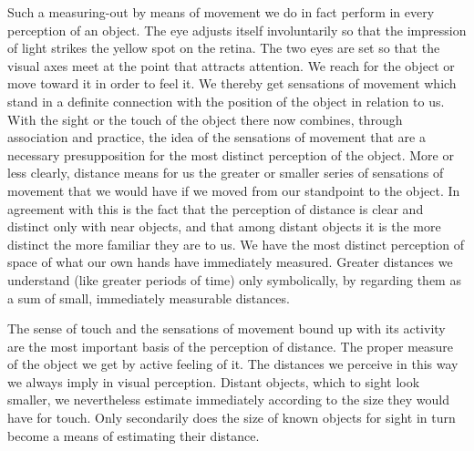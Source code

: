 \documentclass[12pt,a4paper]{book}
\newcommand{\opage}[1]{\marginnote{\footnotesize\textit{[#1]}}}
\begin{document}
Such a measuring-out by means of movement we do in fact perform in every
perception of an object. The eye adjusts itself involuntarily so that
the impression of light strikes the yellow spot on the retina. The two
eyes are set so that the visual axes meet at the point that attracts
attention. We reach for the object or move toward it in order to feel
it. We thereby get sensations of movement which stand in a definite
connection with the position of the object in relation to us. With the
sight or the touch of the object there now combines, through association
and practice, the idea of the sensations of movement that are a
necessary presupposition for the most distinct perception of the object.
More or less clearly, distance means for us the greater or smaller
series of sensations of movement that we would have if we moved from our
standpoint to the object. In agreement with this is the fact that the
perception of distance is clear and distinct only with near objects, and
that among distant objects it is the more distinct the more familiar they
are to us. We have the most distinct perception of space of what our own
hands have immediately measured. Greater distances we understand (like
greater periods of time) only symbolically, by regarding them as a sum of
small, immediately measurable distances.

The sense of touch and the sensations of movement bound up with its
activity are the most important basis of the perception of distance. The
proper measure of the object we get by active feeling
\opage{238}of it. The distances we perceive in this way we always imply
in visual perception. Distant objects, which to sight look smaller, we
nevertheless estimate immediately according to the size they would have
for touch. Only secondarily does the size of known objects for sight in
turn become a means of estimating their distance.
\end{document}
